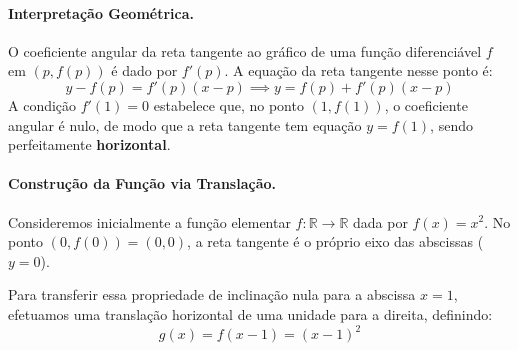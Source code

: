 \paragraph{Interpretação Geométrica.}

O coeficiente angular da reta tangente ao gráfico de uma função diferenciável $f$ em $(p, f(p))$ é dado por $f'(p)$. A equação da reta tangente nesse ponto é:
\[
y - f(p) = f'(p)(x - p) \implies y = f(p) + f'(p)(x - p)
\]
A condição $f'(1) = 0$ estabelece que, no ponto $(1, f(1))$, o coeficiente angular é nulo, de modo que a reta tangente tem equação $y = f(1)$, sendo perfeitamente \textbf{horizontal}.

\paragraph{Construção da Função via Translação.}

Consideremos inicialmente a função elementar $f:\mathbb{R} \to \mathbb{R}$ dada por $f(x) = x^2$. No ponto $(0, f(0)) = (0, 0)$, a reta tangente é o próprio eixo das abscissas ($y = 0$). 

Para transferir essa propriedade de inclinação nula para a abscissa $x = 1$, efetuamos uma translação horizontal de uma unidade para a direita, definindo:
\[
g(x) = f(x - 1) = (x - 1)^2
\]

